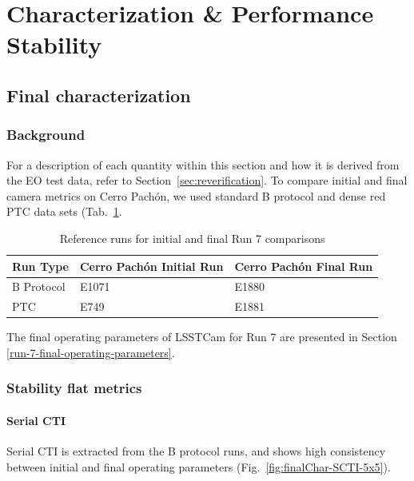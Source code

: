 

\clearpage

\section{Characterization \& Performance Stability}\label{characterization-camera-stability}



\subsection{Final characterization}\label{sec:finalCharacterization}
\subsubsection{Background}\label{final_background}

For a description of each quantity within this section and how it is derived from the EO test data, refer to Section~\ref{sec:reverification}. To compare initial and final camera metrics on Cerro Pachón, we used standard B protocol and dense red PTC data sets (Tab.~\ref{tab:runTable}.

\begin{table}[ht]
\centering
\caption{Reference runs for initial and final Run 7 comparisons}
\label{tab:runTable}
\begin{tabular}{|l|l|l|}
\hline
\textbf{Run Type} & \textbf{Cerro Pachón Initial Run} & \textbf{Cerro Pachón Final Run} \\ \hline
B Protocol & E1071 & E1880 \\ \hline
PTC        & E749  & E1881 \\ \hline
\end{tabular}
\end{table}


The final operating parameters of LSSTCam for Run 7 are presented in Section \ref{run-7-final-operating-parameters}.

\subsubsection{Stability flat metrics}\label{sec:finalstability-flat-metrics}

\paragraph{Serial CTI}\label{sec:finalChar-serial-cti}

Serial CTI is extracted from the B protocol runs, and shows high consistency between initial and final operating parameters (Fig.~\ref{fig:finalChar-SCTI-5x5}). 

